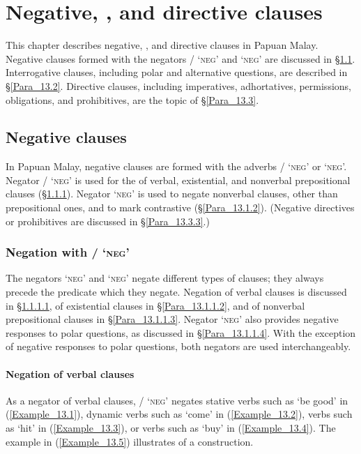 \chapter[Negative, interrogative, and directive clauses]{Negative, , and directive clauses}
\label{Para_13}
This chapter describes negative, , and directive clauses in Papuan Malay. Negative clauses formed with the negators / ‘\textsc{neg}’ and  ‘\textsc{neg}’ are discussed in §\ref{Para_13.1}. Interrogative clauses, including polar and alternative questions, are described in §\ref{Para_13.2}. Directive clauses, including imperatives, adhortatives, permissions, obligations, and prohibitives, are the topic of §\ref{Para_13.3}.


\section{Negative clauses}
\label{Para_13.1}
In Papuan Malay, negative clauses are formed with the  adverbs / ‘\textsc{neg}’ or  ‘\textsc{neg}’. Negator / ‘\textsc{neg}’ is used for the  of verbal, existential, and nonverbal prepositional clauses (§\ref{Para_13.1.1}). Negator  ‘\textsc{neg}’ is used to negate nonverbal clauses, other than prepositional ones, and to mark contrastive  (§\ref{Para_13.1.2}). (Negative directives or prohibitives are discussed in §\ref{Para_13.3.3}.)


\subsection{Negation with / ‘\textsc{neg}’}
\label{Para_13.1.1}
The negators  ‘\textsc{neg}’ and  ‘\textsc{neg}’ negate different types of clauses; they always precede the predicate which they negate. Negation of verbal clauses is discussed in §\ref{Para_13.1.1.1}, of existential clauses in §\ref{Para_13.1.1.2}, and of nonverbal prepositional clauses in §\ref{Para_13.1.1.3}. Negator  ‘\textsc{neg}’ also provides negative responses to polar questions, as discussed in §\ref{Para_13.1.1.4}. With the exception of negative responses to polar questions, both negators are used interchangeably.


\subsubsection[Negation of verbal clauses]{Negation of verbal clauses}
\label{Para_13.1.1.1}
As a negator of verbal clauses, / ‘\textsc{neg}’ negates stative verbs such as  ‘be good’ in (\ref{Example_13.1}), dynamic verbs such as  ‘come’ in (\ref{Example_13.2}),  verbs such as  ‘hit’ in (\ref{Example_13.3}), or  verbs such as  ‘buy’ in (\ref{Example_13.4}). The example in (\ref{Example_13.5}) illustrates  of a  construction.




